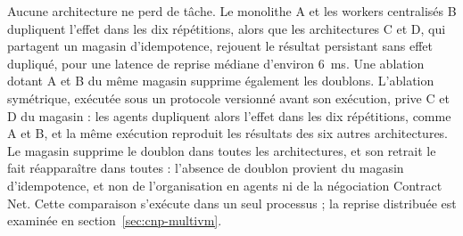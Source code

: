 \begin{table}[H]
\centering
\caption[Panne après persistance et avant \texttt{RESULT}, dix répétitions par architecture.]{Panne après persistance et avant \texttt{RESULT}, dix répétitions par architecture. $^{*}$~Ablation exécutée sous protocole préenregistré, dans une exécution qui rejoue aussi les six autres lignes avec les mêmes doublons et pertes.}
\label{tab:panne-appariee}
\small
{}
\end{table}

Aucune architecture ne perd de tâche. Le monolithe A et les workers centralisés B dupliquent l'effet dans les dix répétitions, alors que les architectures C et D, qui partagent un magasin d'idempotence, rejouent le résultat persistant sans effet dupliqué, pour une latence de reprise médiane d'environ 6~ms. Une ablation dotant A et B du même magasin supprime également les doublons. L'ablation symétrique, exécutée sous un protocole versionné avant son exécution, prive C et D du magasin : les agents dupliquent alors l'effet dans les dix répétitions, comme A et B, et la même exécution reproduit les résultats des six autres architectures. Le magasin supprime le doublon dans toutes les architectures, et son retrait le fait réapparaître dans toutes : l'absence de doublon provient du magasin d'idempotence, et non de l'organisation en agents ni de la négociation Contract Net. Cette comparaison s'exécute dans un seul processus ; la reprise distribuée est examinée en section~\ref{sec:cnp-multivm}.

